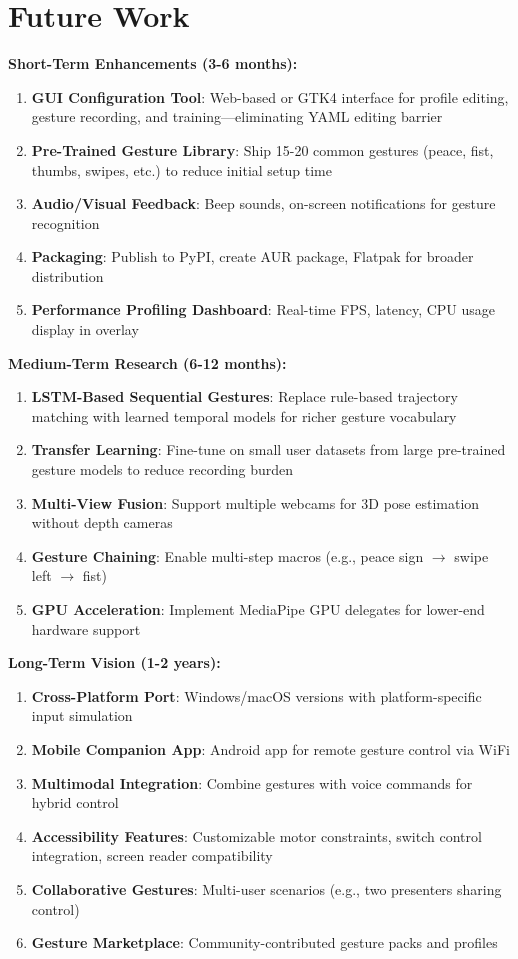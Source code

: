 \documentclass[11pt,a4paper]{article}
\begin{document}
\section{Future Work}

\textbf{Short-Term Enhancements (3-6 months):}
\begin{enumerate}
\item \textbf{GUI Configuration Tool}: Web-based or GTK4 interface for profile editing, gesture recording, and training—eliminating YAML editing barrier
\item \textbf{Pre-Trained Gesture Library}: Ship 15-20 common gestures (peace, fist, thumbs, swipes, etc.) to reduce initial setup time
\item \textbf{Audio/Visual Feedback}: Beep sounds, on-screen notifications for gesture recognition
\item \textbf{Packaging}: Publish to PyPI, create AUR package, Flatpak for broader distribution
\item \textbf{Performance Profiling Dashboard}: Real-time FPS, latency, CPU usage display in overlay
\end{enumerate}

\textbf{Medium-Term Research (6-12 months):}
\begin{enumerate}
\item \textbf{LSTM-Based Sequential Gestures}: Replace rule-based trajectory matching with learned temporal models for richer gesture vocabulary
\item \textbf{Transfer Learning}: Fine-tune on small user datasets from large pre-trained gesture models to reduce recording burden
\item \textbf{Multi-View Fusion}: Support multiple webcams for 3D pose estimation without depth cameras
\item \textbf{Gesture Chaining}: Enable multi-step macros (e.g., peace sign $\rightarrow$ swipe left $\rightarrow$ fist)
\item \textbf{GPU Acceleration}: Implement MediaPipe GPU delegates for lower-end hardware support
\end{enumerate}

\textbf{Long-Term Vision (1-2 years):}
\begin{enumerate}
\item \textbf{Cross-Platform Port}: Windows/macOS versions with platform-specific input simulation
\item \textbf{Mobile Companion App}: Android app for remote gesture control via WiFi
\item \textbf{Multimodal Integration}: Combine gestures with voice commands for hybrid control
\item \textbf{Accessibility Features}: Customizable motor constraints, switch control integration, screen reader compatibility
\item \textbf{Collaborative Gestures}: Multi-user scenarios (e.g., two presenters sharing control)
\item \textbf{Gesture Marketplace}: Community-contributed gesture packs and profiles
\end{enumerate}
\end{document}
